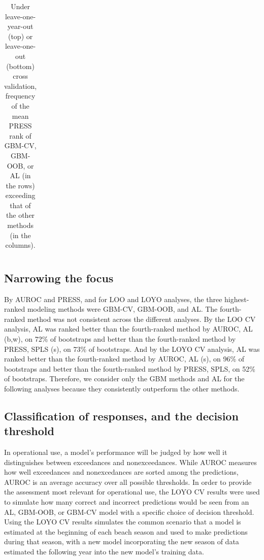 \begin{table}
\begin{tabular}{rccccccc}
    \end{tabular}
    \caption{Under leave-one-year-out (top) or leave-one-out (bottom) cross validation, frequency of the mean PRESS rank of GBM-CV, GBM-OOB, or AL (in the rows) exceeding that of the other methods (in the columns).}
    \label{table:press.pairs.annual}
\end{table}

\subsection{Narrowing the focus}\label{narrowing-the-focus}

By AUROC and PRESS, and for LOO and LOYO analyses, the three
highest-ranked modeling methods were GBM-CV, GBM-OOB, and AL. The
fourth-ranked method was not consistent across the different analyses.
By the LOO CV analysis, AL was ranked better than the fourth-ranked
method by AUROC, AL (b,w), on 72\% of bootstraps and better than the
fourth-ranked method by PRESS, SPLS (s), on 73\% of bootstraps. And by
the LOYO CV analysis, AL was ranked better than the fourth-ranked method
by AUROC, AL (s), on 96\% of bootstraps and better than the
fourth-ranked method by PRESS, SPLS, on 52\% of bootstraps. Therefore,
we consider only the GBM methods and AL for the following analyses
because they consistently outperform the other methods.

\subsection{Classification of responses, and the decision
threshold}\label{threshold}

In operational use, a model's performance will be judged by how well it
distinguishes between exceedances and nonexceedances. While AUROC
measures how well exceedances and nonexcedances are sorted among the
predictions, AUROC is an average accuracy over all possible thresholds.
In order to provide the assessment most relevant for operational use,
the LOYO CV results were used to simulate how many correct and incorrect
predictions would be seen from an AL, GBM-OOB, or GBM-CV model with a
specific choice of decision threshold. Using the LOYO CV results
simulates the common scenario that a model is estimated at the beginning
of each beach season and used to make predictions during that season,
with a new model incorporating the new season of data estimated the
following year into the new model's training data.

